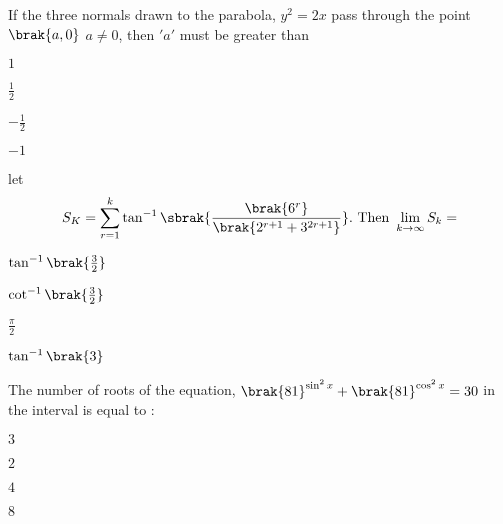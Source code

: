     \item 
    If the three normals drawn to the parabola, $y^2 = 2x$ pass through the point $\brak{a, 0}$ $a \neq 0$, then $'a'$ must be greater than

    \hfill{}
    
    \begin{enumerate}
    \begin{multicols}{4}
        \item $1$
        \item $\frac{1}{2}$
        \item $-\frac{1}{2}$
        \item $-1$
    \end{multicols}
    \end{enumerate}

    \item
    let  
    \begin{align*}
        S_K = \sum_{r=1}^k \tan^{-1} \sbrak{\frac{\brak{6^r}}{\brak{2^{r+1} + 3^{2r+1}}}}. \text{ Then } \lim_{k\to\infty} S_k = 
    \end{align*}

    \hfill{}
    
    \begin{enumerate}
    \begin{multicols}{4}
        \item $\tan^{-1}{\brak{\frac{3}{2}}}$
        \item $\cot^{-1}{\brak{\frac{3}{2}}}$
        \item $\frac{\pi}{2}$
        \item $\tan^{-1}{\brak{3}}$
    \end{multicols}
    \end{enumerate}

    \item 
    The number of roots of the equation, $\brak{81}^{\sin^2{x}} + \brak{81}^{\cos^2{x}} = 30$ in the interval  is equal to : 

    \hfill{}
    
    \begin{enumerate}
    \begin{multicols}{4}
        \item $3$
        \item $2$
        \item $4$
        \item $8$
    \end{multicols}
    \end{enumerate}

